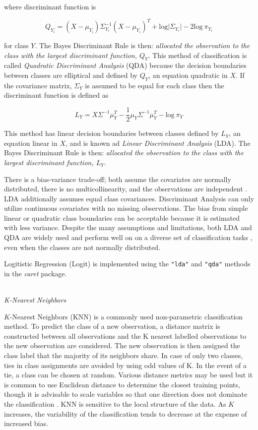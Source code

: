 \documentclass[12pt,]{article}
\begin{document}
where discriminant function is

\[
Q_{Y_i} = (X - \mu_{Y_i}) \Sigma^{-1}_{Y_i} (X - \mu_{Y_i})^T + \text{log} \vert \Sigma_{Y_i} \vert - 2\text{log} ~\pi_{Y_i}   \tag{5}
\]

for class \(Y\). The Bayes Discriminant Rule is then: \emph{allocated
the observation to the class with the largest discriminant function,
\(Q_Y\)}. This method of classification is called \emph{Quadratic
Discriminant Analysis} (QDA) because the decision boundaries between
classes are elliptical and defined by \(Q_Y\), an equation quadratic in
\(X\). If the covariance matrix, \(\Sigma_Y\) is assumed to be equal for
each class then the discriminant function is defined as

\[
L_Y = X \Sigma^{-1} \mu_Y^T -\frac{1}{2}\mu_Y \Sigma^{-1} \mu_Y^T  - \text{log} ~\pi_Y     \tag{6}
\]

This method has linear decision boundaries between classes defined by
\(L_Y\), an equation linear in \(X\), and is known ad \emph{Linear
Discriminant Analysis} (LDA). The Bayes Discriminant Rule is then:
\emph{allocated the observation to the class with the largest
discriminant function, \(L_Y\)}.

There is a bias-variance trade-off; both assume the covariates are
normally distributed, there is no multicollinearity, and the
observations are independent \autocite{cover_geometrical_1965}. LDA
additionally assumes equal class covariances. Discriminant Analysis can
only utilize continuous covariates with no missing observations. The
bias from simple linear or quadratic class boundaries can be acceptable
because it is estimated with less variance. Despite the many assumptions
and limitations, both LDA and QDA are widely used and perform well on on
a diverse set of classification tasks \autocite{hastie_elements_2009},
even when the classes are not normally distributed.

Logitistic Regression (Logit) is implemented using the \texttt{"lda"}
and \texttt{"qda"} methods in the \emph{caret} package.

\(~\)\\
\emph{K-Nearest Neighbors}

\(K\)-Nearest Neighbors (KNN) is a commonly used non-parametric
classification method. To predict the class of a new observation, a
distance matrix is constructed between all observations and the K
nearest labelled observations to the new observation are considered. The
new observation is then assigned the class label that the majority of
its neighbors share. In case of only two classes, ties in class
assignments are avoided by using odd values of K. In the event of a tie,
a class can be chosen at random. Various distance metrics may be used
but it is common to use Euclidean distance to determine the closest
training points, though it is advisable to scale variables so that one
direction does not dominate the classification
\autocite[pp.456]{hastie_elements_2009}. KNN is sensitive to the local
structure of the data. As \(K\) increases, the variability of the
classification tends to decrease at the expense of increased bias.
\end{document}
